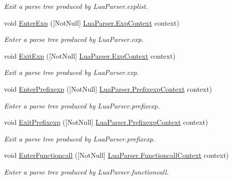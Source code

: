 \begin{DoxyCompactItemize}
\begin{DoxyCompactList}\small\item\em Exit a parse tree produced by Lua\+Parser.\+explist. \end{DoxyCompactList}\item 
void \mbox{\hyperlink{interfacezlua_1_1_i_lua_listener_ac285772a04450f04a0552656841f1207}{Enter\+Exp}} (\mbox{[}Not\+Null\mbox{]} \mbox{\hyperlink{classzlua_1_1_lua_parser_1_1_exp_context}{Lua\+Parser.\+Exp\+Context}} context)
\begin{DoxyCompactList}\small\item\em Enter a parse tree produced by Lua\+Parser.\+exp. \end{DoxyCompactList}\item 
void \mbox{\hyperlink{interfacezlua_1_1_i_lua_listener_adb4a861f691615f081c5910a78e507bd}{Exit\+Exp}} (\mbox{[}Not\+Null\mbox{]} \mbox{\hyperlink{classzlua_1_1_lua_parser_1_1_exp_context}{Lua\+Parser.\+Exp\+Context}} context)
\begin{DoxyCompactList}\small\item\em Exit a parse tree produced by Lua\+Parser.\+exp. \end{DoxyCompactList}\item 
void \mbox{\hyperlink{interfacezlua_1_1_i_lua_listener_a77ffdad769c7c8266a678e93c529cdf6}{Enter\+Prefixexp}} (\mbox{[}Not\+Null\mbox{]} \mbox{\hyperlink{classzlua_1_1_lua_parser_1_1_prefixexp_context}{Lua\+Parser.\+Prefixexp\+Context}} context)
\begin{DoxyCompactList}\small\item\em Enter a parse tree produced by Lua\+Parser.\+prefixexp. \end{DoxyCompactList}\item 
void \mbox{\hyperlink{interfacezlua_1_1_i_lua_listener_a844508765196c91884c10bcaa1a14424}{Exit\+Prefixexp}} (\mbox{[}Not\+Null\mbox{]} \mbox{\hyperlink{classzlua_1_1_lua_parser_1_1_prefixexp_context}{Lua\+Parser.\+Prefixexp\+Context}} context)
\begin{DoxyCompactList}\small\item\em Exit a parse tree produced by Lua\+Parser.\+prefixexp. \end{DoxyCompactList}\item 
void \mbox{\hyperlink{interfacezlua_1_1_i_lua_listener_aed7b99a3790f95b4b5e3d7cac6d3361d}{Enter\+Functioncall}} (\mbox{[}Not\+Null\mbox{]} \mbox{\hyperlink{classzlua_1_1_lua_parser_1_1_functioncall_context}{Lua\+Parser.\+Functioncall\+Context}} context)
\begin{DoxyCompactList}\small\item\em Enter a parse tree produced by Lua\+Parser.\+functioncall. \end{DoxyCompactList}\item 

\end{DoxyCompactItemize}
